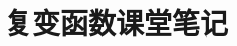 \usepackage[margin=2.5cm]{geometry}
\usepackage{amsmath,amssymb,amsthm}
\usepackage{graphicx}
\usepackage[colorlinks=true,linkcolor=blue]{hyperref}
\newtheorem{proposition}{命题}

\title{复变函数课堂笔记}
\author{}
\date{}
